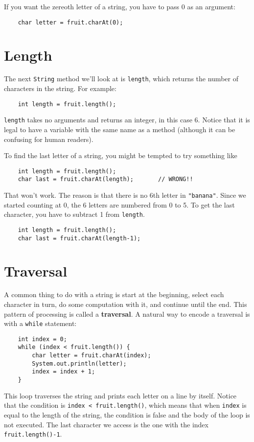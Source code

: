 \documentclass[12pt]{book}
\theoremstyle{definition}
\begin{document}
If you want the zereoth letter of a string, you have to pass
0 as an argument:

\begin{lstlisting}
    char letter = fruit.charAt(0);
\end{lstlisting}


\section{Length}

The next {\tt String} method we'll look at is {\tt length}, which
returns the number of characters in the string.  For example:

\begin{lstlisting}
    int length = fruit.length();
\end{lstlisting}
%
{\tt length} takes no arguments
and returns an integer, in this case 6.  Notice that it is
legal to have a variable with the same name as a method (although
it can be confusing for human readers).

To find the last letter of a string, you might be tempted to
try something like

\begin{lstlisting}
    int length = fruit.length();
    char last = fruit.charAt(length);       // WRONG!!
\end{lstlisting}
%
That won't work.  The reason is that there is no 6th letter
in {\tt "banana"}.  Since we started counting at 0, the 6
letters are numbered from 0 to 5.  To get the last character,
you have to subtract 1 from {\tt length}.

\begin{lstlisting}
    int length = fruit.length();
    char last = fruit.charAt(length-1);
\end{lstlisting}


\section{Traversal}
\label{traverse}

A common thing to do with a string is
start at the beginning, select each character in turn, do
some computation with it, and continue until the end.  This pattern
of processing is called a {\bf traversal}.  A natural
way to encode a traversal is with a {\tt while} statement:

\begin{lstlisting}
    int index = 0;
    while (index < fruit.length()) {
        char letter = fruit.charAt(index);
        System.out.println(letter);
        index = index + 1;
    }
\end{lstlisting}
%
This loop traverses the string and prints each letter on
a line by itself.  Notice that the condition is
{\tt index < fruit.length()}, which means that when
{\tt index} is equal to the length of the string, the
condition is false and the body of the loop is not executed.
The last character we access is the one with the
index {\tt fruit.length()-1}.
\end{document}
